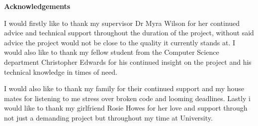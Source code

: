 \thispagestyle{empty}

\begin{center}
    {\LARGE\bf Acknowledgements}
\end{center}

I would firstly like to thank my supervisor Dr Myra Wilson for her continued advice and technical support throughout the duration of the project, without said advice the project would not be close to the quality it currently stands at. I would also like to thank my fellow student from the Computer Science department Christopher Edwards for his continued insight on the project and his technical knowledge in times of need. 

I would also like to thank my family for their continued support  and my house mates for listening to me stress over broken code and looming deadlines. Lastly i would like to thank my girlfriend Rosie Howes for her love and support through not just a demanding project but throughout my time at University.
